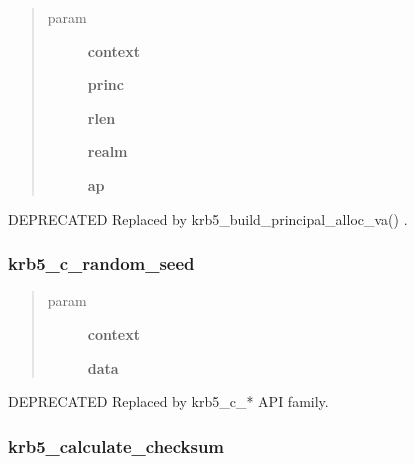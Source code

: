 \documentclass[letterpaper,10pt,english]{sphinxmanual}
\begin{document}
\begin{quote}\begin{description}
\item[{param}] \leavevmode
\textbf{context}

\textbf{princ}

\textbf{rlen}

\textbf{realm}

\textbf{ap}

\end{description}\end{quote}

DEPRECATED Replaced by krb5\_build\_principal\_alloc\_va() .


\subsubsection{krb5\_c\_random\_seed}
\label{appdev/refs/api/krb5_c_random_seed:krb5-c-random-seed}\label{appdev/refs/api/krb5_c_random_seed::doc}

\begin{fulllineitems}
\label{appdev/refs/api/krb5_c_random_seed:krb5_c_random_seed}
\end{fulllineitems}

\begin{quote}\begin{description}
\item[{param}] \leavevmode
\textbf{context}

\textbf{data}

\end{description}\end{quote}

DEPRECATED Replaced by krb5\_c\_* API family.


\subsubsection{krb5\_calculate\_checksum}
\label{appdev/refs/api/krb5_calculate_checksum:krb5-calculate-checksum}\label{appdev/refs/api/krb5_calculate_checksum::doc}
\end{document}
